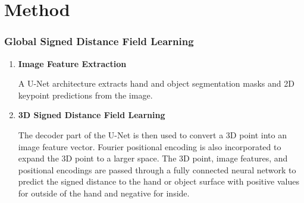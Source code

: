 \documentclass{article}
\begin{document}
\section*{Method}

\subsubsection*{Global Signed Distance Field Learning}
\begin{enumerate}
    \item \textbf{Image Feature Extraction}
    
    A U-Net architecture extracts hand and object segmentation masks and 2D keypoint predictions from the image.

    \item \textbf{3D Signed Distance Field Learning}
    
    The decoder part of the U-Net is then used to convert a 3D point into an image feature vector. Fourier positional encoding is also incorporated to expand the 3D point to a larger space. The 3D point, image features, and positional encodings are passed through a fully connected neural network to predict the signed distance to the hand or object surface with positive values for outside of the hand and negative for inside.
\end{enumerate}
\end{document}
